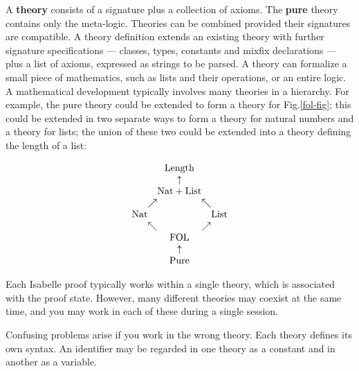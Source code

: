 A {\bf theory} consists of a signature plus a collection of axioms.  The
{\bf pure} theory contains only the meta-logic.  Theories can be combined
provided their signatures are compatible.  A theory definition extends an
existing theory with further signature specifications --- classes, types,
constants and mixfix declarations --- plus a list of axioms, expressed as
strings to be parsed.  A theory can formalize a small piece of mathematics,
such as lists and their operations, or an entire logic.  A mathematical
development typically involves many theories in a hierarchy.  For example,
the pure theory could be extended to form a theory for
Fig.\ts\ref{fol-fig}; this could be extended in two separate ways to form a
theory for natural numbers and a theory for lists; the union of these two
could be extended into a theory defining the length of a list:
\begin{tt}
\[
\begin{array}{c@{}c@{}c@{}c@{}c}
     {}   &     {} & \hbox{Length} &  {}   &     {}   \\
     {}   &     {}   &  \uparrow &     {}   &     {}   \\
     {}   &     {} &\hbox{Nat}+\hbox{List}&  {}   &     {}   \\
     {}   & \nearrow &     {}    & \nwarrow &     {}   \\
 \hbox{Nat} &   {}   &     {}    &     {}   & \hbox{List} \\
     {}   & \nwarrow &     {}    & \nearrow &     {}   \\
     {}   &     {}   &\hbox{FOL} &     {}   &     {}   \\
     {}   &     {}   &  \uparrow &     {}   &     {}   \\
     {}   &     {}   &\hbox{Pure}&     {}  &     {}
\end{array}
\]
\end{tt}%
Each Isabelle proof typically works within a single theory, which is
associated with the proof state.  However, many different theories may
coexist at the same time, and you may work in each of these during a single
session.  

\begin{warn}%
  Confusing problems arise if you work in the wrong theory.  Each theory
  defines its own syntax.  An identifier may be regarded in one theory as a
  constant and in another as a variable.
\end{warn}

